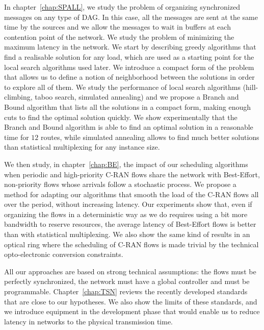 In chapter~\ref{chap:SPALL}, we study the problem of organizing synchronized messages on any type of DAG. In this case, all the messages are sent at the same time by the sources and we allow the messages to wait in buffers at each contention point of the network. We study the problem of minimizing the maximum latency in the network. We start by describing greedy algorithms that find a realisable solution for any load, which are used as a starting point for the local search algorithms used later. We introduce a compact form of the problem that allows us to define a notion of neighborhood between the solutions in order to explore all of them. We study the performance of local search algorithms (hill-climbing, taboo search, simulated annealing) and we propose a Branch and Bound algorithm that lists all the solutions in a compact form, making enough cuts to find the optimal solution quickly. We show experimentally that the Branch and Bound algorithm is able to find an optimal solution in a reasonable time for $12$ routes, while simulated annealing allows to find much better solutions than statistical multiplexing for any instance size.

We then study, in chapter~\ref{chap:BE}, the impact of our scheduling algorithms when periodic and high-priority C-RAN flows share the network with Best-Effort, non-priority flows whose arrivals follow a stochastic process. We propose a method for adapting our algorithms that smooth the load of the C-RAN flows all over the period, without increasing latency. Our experiments show that, even if organizing the flows in a deterministic way as we do requires using a bit more bandwidth to reserve resources, the average latency of Best-Effort flows is better than with statistical multiplexing. We also show the same kind of results in an optical ring where the scheduling of C-RAN flows is made trivial by the technical opto-electronic conversion constraints. 

All our approaches are based on strong technical assumptions: the flows must be perfectly synchronized, the network must have a global controller and must be programmable. Chapter~\ref{chap:TSN} reviews the recently developed standards that are close to our hypotheses. We also show the limits of these standards, and we introduce equipment in the development phase that would enable us to reduce latency in networks to the physical transmission time.
